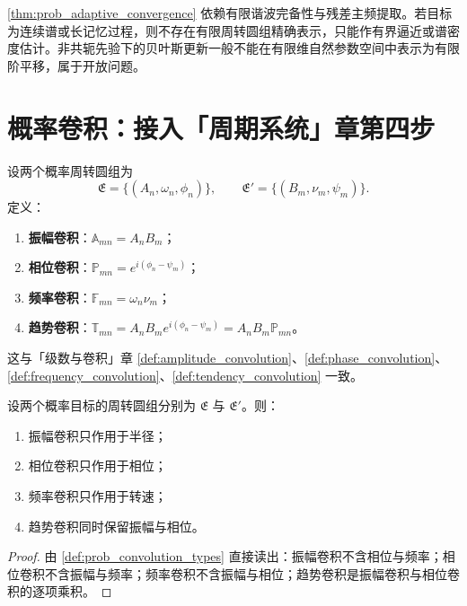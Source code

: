 \begin{remark}[动态调节的边界]\label{rem:prob_adaptive_boundary}
\cref{thm:prob_adaptive_convergence} 依赖有限谐波完备性与残差主频提取。若目标为连续谱或长记忆过程，则不存在有限周转圆组精确表示，只能作有界逼近或谱密度估计。非共轭先验下的贝叶斯更新一般不能在有限维自然参数空间中表示为有限阶平移，属于开放问题。
\end{remark}

\section{概率卷积：接入「周期系统」章第四步}
\label{sec:prob_convolution}

\begin{definition}\label{def:prob_convolution_types}
设两个概率周转圆组为
\[
\mathfrak E=\{(A_n,\omega_n,\phi_n)\},\qquad
\mathfrak E'=\{(B_m,\nu_m,\psi_m)\}.
\]
定义：
\begin{enumerate}[label=(\roman*)]
    \item \textbf{振幅卷积}：$\mathbb A_{mn}=A_nB_m$；
    \item \textbf{相位卷积}：$\mathbb P_{mn}=e^{i(\phi_n-\psi_m)}$；
    \item \textbf{频率卷积}：$\mathbb F_{mn}=\omega_n\nu_m$；
    \item \textbf{趋势卷积}：$\mathbb T_{mn}=A_nB_m e^{i(\phi_n-\psi_m)}=A_nB_m\mathbb P_{mn}$。
\end{enumerate}
这与「级数与卷积」章 \cref{def:amplitude_convolution}、\cref{def:phase_convolution}、\cref{def:frequency_convolution}、\cref{def:tendency_convolution} 一致。
\end{definition}

\begin{theorem}[三类卷积在概率周转圆组上的作用]\label{thm:prob_convolution_action}
设两个概率目标的周转圆组分别为 $\mathfrak E$ 与 $\mathfrak E'$。则：
\begin{enumerate}[label=(\roman*)]
    \item 振幅卷积只作用于半径；
    \item 相位卷积只作用于相位；
    \item 频率卷积只作用于转速；
    \item 趋势卷积同时保留振幅与相位。
\end{enumerate}
\end{theorem}

\begin{proof}
由 \cref{def:prob_convolution_types} 直接读出：振幅卷积不含相位与频率；相位卷积不含振幅与频率；频率卷积不含振幅与相位；趋势卷积是振幅卷积与相位卷积的逐项乘积。
\end{proof}

